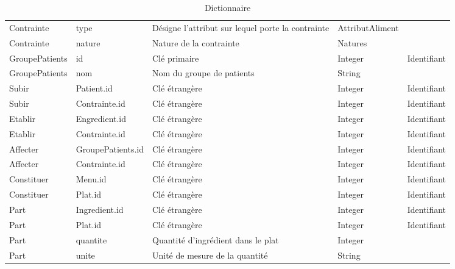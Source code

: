 \begin{table}
\begin{tabular}{llp{5cm}ll}
  Contrainte & type & Désigne l'attribut sur lequel porte la contrainte & AttributAliment &  \\
  Contrainte & nature & Nature de la contrainte & Natures & \\ \hline
  GroupePatients & id & Clé primaire & Integer & Identifiant \\
  GroupePatients & nom & Nom du groupe de patients & String & \\ \hline
  Subir & Patient.id & Clé étrangère & Integer & Identifiant \\
  Subir & Contrainte.id & Clé étrangère & Integer & Identifiant \\ \hline
  Etablir & Engredient.id & Clé étrangère & Integer & Identifiant \\
  Etablir & Contrainte.id & Clé étrangère & Integer & Identifiant \\ \hline
  Affecter & GroupePatients.id & Clé étrangère & Integer & Identifiant \\
  Affecter & Contrainte.id & Clé étrangère & Integer & Identifiant \\ \hline
  Constituer & Menu.id & Clé étrangère & Integer & Identifiant \\
  Constituer & Plat.id & Clé étrangère & Integer & Identifiant \\ \hline
  Part & Ingredient.id & Clé étrangère & Integer & Identifiant \\
  Part & Plat.id & Clé étrangère & Integer & Identifiant \\
  Part & quantite & Quantité d'ingrédient dans le plat & Integer & \\
  Part & unite & Unité de mesure de la quantité & String & \\ \hline
\end{tabular}
\caption{Dictionnaire}
\label{DictionnaireMDD}
\end{table}

